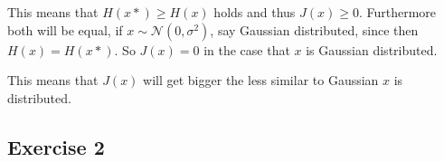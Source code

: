 \documentclass[10pt,a4paper]{article}
\begin{document}
\begin{enumerate}[(a)]
This means that $H(x*) \ge H(x)$ holds and thus $J(x) \ge 0$. Furthermore both will be equal, if $x \sim \mathcal{N}(0,\sigma^2)$, say Gaussian distributed, since then $H(x) = H(x*)$. So $J(x) = 0$ in the case that $x$ is Gaussian distributed.

This means that $J(x)$ will get bigger the less similar to Gaussian $x$ is distributed.
\end{enumerate}

\subsection*{Exercise 2}
\end{document}
